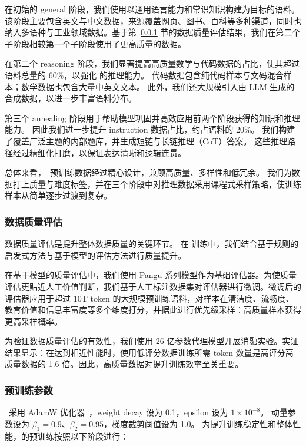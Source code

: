 在初始的 general 阶段，我们使用以通用语言能力和常识知识构建为目标的语料。
该阶段主要包含英文与中文数据，来源覆盖网页、图书、百科等多种渠道，同时也纳入多语种与工业领域数据。基于第~\ref{sec:data_quality} 节的数据质量评估结果，我们在第二个子阶段相较第一个子阶段使用了更高质量的数据。

在第二个 reasoning 阶段，我们显著提高高质量数学与代码数据的占比，使其超过语料总量的 60\%，以强化 \modelname 的推理能力。
代码数据包含纯代码样本与文码混合样本；数学数据也包含大量中英文文本。
此外，我们还大规模引入由 LLM 生成的合成数据，以进一步丰富语料分布。


第三个 annealing 阶段用于帮助模型巩固并高效应用前两个阶段获得的知识和推理能力。
因此我们进一步提升 instruction 数据占比，约占语料的 20\%。
我们构建了覆盖广泛主题的内部题库，并生成短链与长链推理（CoT）答案。
这些推理路径经过精细化打磨，以保证表达清晰和逻辑连贯。

总体来看，\modelname~预训练数据经过精心设计，兼顾高质量、多样性和低冗余。
我们为数据打上质量与难度标签，并在三个阶段中对推理数据采用课程式采样策略，使训练样本从简单逐步过渡到复杂。



\subsubsection{数据质量评估}
\label{sec:data_quality}

数据质量评估是提升整体数据质量的关键环节。
在 \modelname 训练中，我们结合基于规则的启发式方法与基于模型的评估方法进行质量提升。

在基于模型的质量评估中，我们使用 Pangu 系列模型作为基础评估器。为使质量评估更贴近人工价值判断，我们基于人工标注数据集对评估器进行微调。微调后的评估器应用于超过 10T token 的大规模预训练语料，对样本在清洁度、流畅度、教育价值和信息丰富度等多个维度打分，并据此进行优先级采样：高质量样本获得更高采样概率。


为验证数据质量评估的有效性，我们使用 26 亿参数代理模型开展消融实验。实证结果显示：在达到相近性能时，使用低评分数据训练所需 token 数量是高评分高质量数据的 1.6 倍。因此，高质量数据对提升训练效率至关重要。



\subsubsection{预训练参数} \label{sec:hyper_params}
\modelname~采用 AdamW 优化器~\cite{loshchilov2017decoupled}，weight decay 设为 0.1，epsilon 设为 $1 \times 10^{-8}$。
动量参数设为 $\beta_1 = 0.9$、$\beta_2 = 0.95$，梯度裁剪阈值设为 1.0。
为提升训练稳定性和整体性能，\modelname 的预训练按照以下阶段进行：


